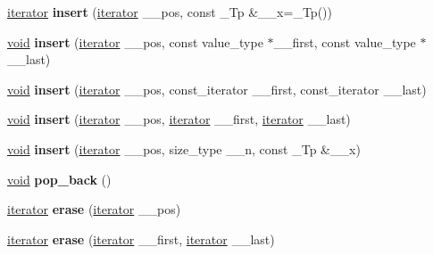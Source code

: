 \begin{DoxyCompactItemize}
\item 
\mbox{\label{structvector_ac0e62344ab7ac5684bd1cc6c7de6a2c9}} 
\hyperlink{structiterator}{iterator} {\bfseries insert} (\hyperlink{structiterator}{iterator} \+\_\+\+\_\+pos, const \+\_\+\+Tp \&\+\_\+\+\_\+x=\+\_\+\+Tp())
\item 
\mbox{\label{structvector_af8454a8502bf12f52d13a8e40c4de31d}} 
\hyperlink{interfacevoid}{void} {\bfseries insert} (\hyperlink{structiterator}{iterator} \+\_\+\+\_\+pos, const value\+\_\+type $\ast$\+\_\+\+\_\+first, const value\+\_\+type $\ast$\+\_\+\+\_\+last)
\item 
\mbox{\label{structvector_a25a4b9f8039c412c282a6ac6174c7b01}} 
\hyperlink{interfacevoid}{void} {\bfseries insert} (\hyperlink{structiterator}{iterator} \+\_\+\+\_\+pos, const\+\_\+iterator \+\_\+\+\_\+first, const\+\_\+iterator \+\_\+\+\_\+last)
\item 
\mbox{\label{structvector_a7fdb28811b77a9c7172e933587531ef1}} 
\hyperlink{interfacevoid}{void} {\bfseries insert} (\hyperlink{structiterator}{iterator} \+\_\+\+\_\+pos, \hyperlink{structiterator}{iterator} \+\_\+\+\_\+first, \hyperlink{structiterator}{iterator} \+\_\+\+\_\+last)
\item 
\mbox{\label{structvector_a9527d106faa2895e8428cd660d45cd19}} 
\hyperlink{interfacevoid}{void} {\bfseries insert} (\hyperlink{structiterator}{iterator} \+\_\+\+\_\+pos, size\+\_\+type \+\_\+\+\_\+n, const \+\_\+\+Tp \&\+\_\+\+\_\+x)
\item 
\mbox{\label{structvector_a0b283d31b60efcb22635718006e37050}} 
\hyperlink{interfacevoid}{void} {\bfseries pop\+\_\+back} ()
\item 
\mbox{\label{structvector_a03451bcd692e6d29f636a2a3cc6396a5}} 
\hyperlink{structiterator}{iterator} {\bfseries erase} (\hyperlink{structiterator}{iterator} \+\_\+\+\_\+pos)
\item 
\mbox{\label{structvector_ac43a0f26f53b294f0648655224aac1d3}} 
\hyperlink{structiterator}{iterator} {\bfseries erase} (\hyperlink{structiterator}{iterator} \+\_\+\+\_\+first, \hyperlink{structiterator}{iterator} \+\_\+\+\_\+last)

\end{DoxyCompactItemize}
